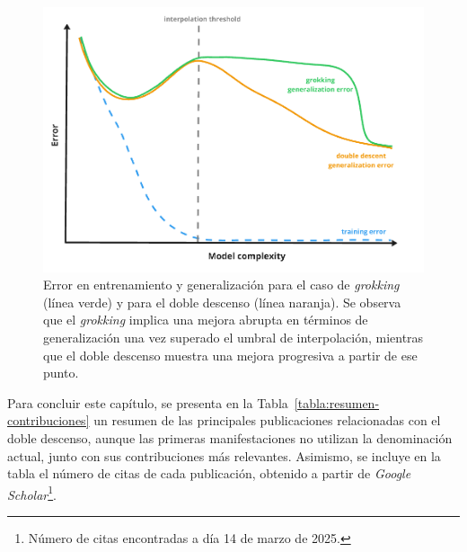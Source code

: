 \begin{figure}[h]
    \centering
    \includegraphics[width=0.6\linewidth]{img/grokking.png}
    \caption[\textit{Grokking} y \textit{Deep Double Descent}.]{Error en entrenamiento y generalización para el caso de \textit{grokking} (línea verde) y para el doble descenso (línea naranja). Se observa que el \textit{grokking} implica una mejora abrupta en términos de generalización una vez superado el umbral de interpolación, mientras que el doble descenso muestra una mejora progresiva a partir de ese punto.}\label{fig:grokking}
\end{figure}

Para concluir este capítulo, se presenta en la Tabla~\ref{tabla:resumen-contribuciones} un resumen de las principales publicaciones relacionadas con el doble descenso, aunque las primeras manifestaciones no utilizan la denominación actual, junto con sus contribuciones más relevantes. Asimismo, se incluye en la tabla el número de citas de cada publicación, obtenido a partir de \textit{Google Scholar}\footnote{Número de citas encontradas a día 14 de marzo de 2025.}.\newline

